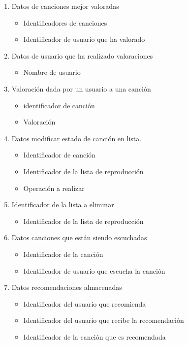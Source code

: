 \documentclass[12pt,a4paper]{article}
\begin{document}
\begin{enumerate}[label=\textnormal{RD\arabic*}]
\begin{itemize}
		\end{itemize}
	\item Datos de canciones mejor valoradas  \label{rd32}
		\begin{itemize}
			\item Identificadores de canciones
			\item Identificador de usuario que ha valorado
		\end{itemize}
	\item Datos de usuario que ha realizado valoraciones  \label{rd33}
		\begin{itemize}
			\item Nombre de usuario
		\end{itemize}
		
	\item Valoración dada por un usuario a una canción  \label{rd34}
		\begin{itemize}
			\item identificador de canción
			\item Valoración
		\end{itemize}
		
	\item Datos modificar estado de canción en lista.  \label{rd35}
		\begin{itemize}
			\item Identificador de canción
			\item Identificador de la lista de reproducción
			\item Operación a realizar
		\end{itemize}
		
	\item Identificador de la lista a eliminar  \label{rd36}
		\begin{itemize}
			\item Identificador de la lista de reproducción
		\end{itemize}
		
	\item Datos canciones que están siendo escuchadas  \label{rd37}
		\begin{itemize}
			\item Identificador de la canción
			\item Identificador de usuario que escucha la canción
		\end{itemize}
				
	\item Datos recomendaciones almacenadas  \label{rd38}
		\begin{itemize}
			\item Identificador del usuario que recomienda
			\item Identificador del usuario que recibe la recomendación
			\item Identificador de la canción que es recomendada
		\end{itemize}
		

\end{enumerate}
\end{document}
